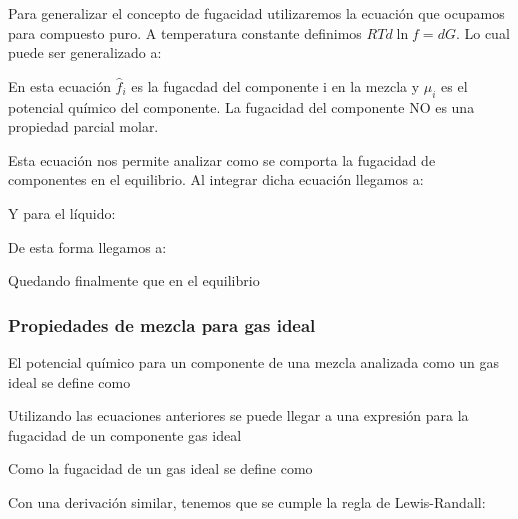 Para generalizar el concepto de fugacidad utilizaremos la ecuación que ocupamos para compuesto puro. A temperatura constante definimos $RT d\ln f = dG$. Lo cual puede ser generalizado a:


En esta ecuación $\hat{f}_i$ es la fugacdad del componente i en la mezcla y $\mu_i$ es el potencial químico del componente. La fugacidad del componente NO es una propiedad parcial molar.

Esta ecuación nos permite analizar como se comporta la fugacidad de componentes en el equilibrio. Al integrar dicha ecuación llegamos a:


Y para el líquido:

De esta forma llegamos a:


Quedando finalmente que en el equilibrio


\subsubsection{Propiedades de mezcla para gas ideal}

El potencial químico para un componente de una mezcla analizada como un gas ideal se define como


Utilizando las ecuaciones anteriores se puede llegar a una expresión para la fugacidad de un componente gas ideal


Como la fugacidad de un gas ideal se define como


Con una derivación similar, tenemos que se cumple la regla de Lewis-Randall:

